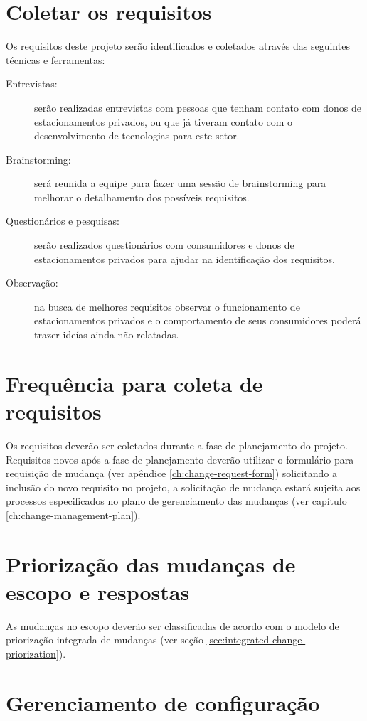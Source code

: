 \section{Coletar os requisitos}

Os requisitos deste projeto serão identificados e coletados através das seguintes técnicas e ferramentas:

\begin{description}
	\item[Entrevistas:] serão realizadas entrevistas com pessoas que tenham contato com donos de estacionamentos privados, ou que já tiveram contato com o desenvolvimento de tecnologias para este setor.
	\item[Brainstorming:] será reunida a equipe para fazer uma sessão de brainstorming para melhorar o detalhamento dos possíveis requisitos.
	\item[Questionários e pesquisas:] serão realizados questionários com consumidores e donos de estacionamentos privados para ajudar na identificação dos requisitos.
	\item[Observação:] na busca de melhores requisitos observar o funcionamento de estacionamentos privados e o comportamento de seus consumidores poderá trazer ideías ainda não relatadas.
\end{description}

\section{Frequência para coleta de requisitos}

Os requisitos deverão ser coletados durante a fase de planejamento do projeto. Requisitos novos após a fase de planejamento deverão utilizar o formulário para requisição de mudança (ver apêndice \ref{ch:change-request-form}) solicitando a inclusão do novo requisito no projeto, a solicitação de mudança estará sujeita aos processos especificados no plano de gerenciamento das mudanças (ver capítulo \ref{ch:change-management-plan}).

\section{Priorização das mudanças de escopo e respostas}

As mudanças no escopo deverão ser classificadas de acordo com o modelo de priorização integrada de mudanças (ver seção \ref{sec:integrated-change-priorization}).

\section{Gerenciamento de configuração}


